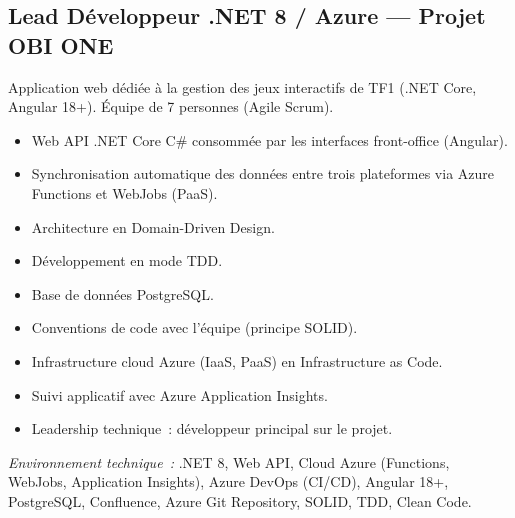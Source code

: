 \documentclass[10pt,a4paper]{article}
\begin{document}
\vspace{4pt}

\subsection*{Lead Développeur .NET 8 / Azure --- Projet OBI ONE}
\color{darkgray}
Application web dédiée à la gestion des jeux interactifs de TF1 (.NET Core, Angular 18+). Équipe de 7 personnes (Agile Scrum).
\begin{itemize}
  \item Web API .NET Core C\# consommée par les interfaces front-office (Angular).
  \item Synchronisation automatique des données entre trois plateformes via Azure Functions et WebJobs (PaaS).
  \item Architecture en Domain-Driven Design.
  \item Développement en mode TDD.
  \item Base de données PostgreSQL.
  \item Conventions de code avec l'équipe (principe SOLID).
  \item Infrastructure cloud Azure (IaaS, PaaS) en Infrastructure as Code.
  \item Suivi applicatif avec Azure Application Insights.
  \item Leadership technique~: développeur principal sur le projet.
\end{itemize}
\textit{Environnement technique~:} .NET 8, Web API, Cloud Azure (Functions, WebJobs, Application Insights), Azure DevOps (CI/CD), Angular 18+, PostgreSQL, Confluence, Azure Git Repository, SOLID, TDD, Clean Code.

\vspace{6pt}
\end{document}
